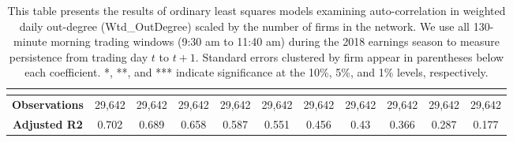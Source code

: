 \begin{table}
{\begin{tabular}{lcccccccccc}
  \multicolumn{1}{l}{} &
  \multicolumn{1}{l}{} \\ \hline
\multicolumn{1}{|c|}{\textbf{Observations}} &
  \multicolumn{1}{c|}{29,642} &
  \multicolumn{1}{c|}{29,642} &
  \multicolumn{1}{c|}{29,642} &
  \multicolumn{1}{c|}{29,642} &
  \multicolumn{1}{c|}{29,642} &
  \multicolumn{1}{c|}{29,642} &
  \multicolumn{1}{c|}{29,642} &
  \multicolumn{1}{c|}{29,642} &
  \multicolumn{1}{c|}{29,642} &
  \multicolumn{1}{c|}{29,642} \\ \hline
\multicolumn{1}{|c|}{\textbf{Adjusted R2}} &
  \multicolumn{1}{c|}{0.702} &
  \multicolumn{1}{c|}{0.689} &
  \multicolumn{1}{c|}{0.658} &
  \multicolumn{1}{c|}{0.587} &
  \multicolumn{1}{c|}{0.551} &
  \multicolumn{1}{c|}{0.456} &
  \multicolumn{1}{c|}{0.43} &
  \multicolumn{1}{c|}{0.366} &
  \multicolumn{1}{c|}{0.287} &
  \multicolumn{1}{c|}{0.177} \\ \hline
\end{tabular}}
\caption{This table presents the results of ordinary least squares models examining auto-correlation in  weighted daily out-degree (Wtd\_OutDegree) scaled by the number of firms in the network.  We use all 130-minute morning trading windows (9:30 am to 11:40 am) during the 2018 earnings season to measure persistence from trading day \(t\) to \(t+1\).   Standard errors clustered by firm appear in parentheses below each coefficient. *, **, and *** indicate significance at the 10\%,  5\%, and 1\% levels, respectively. }
\label{tab:TEAutoCorrOut}
\end{table}


